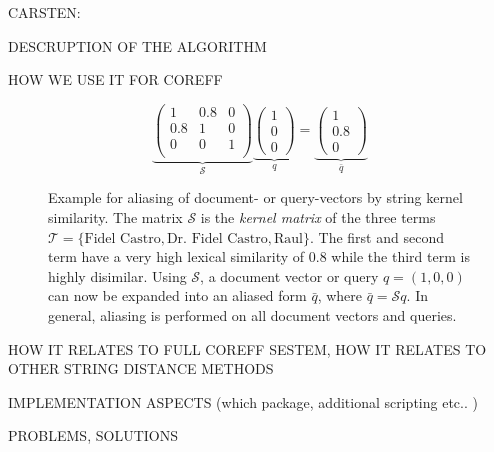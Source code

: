 
CARSTEN:

DESCRUPTION OF THE ALGORITHM

HOW WE USE IT FOR COREFF

\begin{figure}[ht]
  \caption{Example for aliasing of document- or query-vectors by string kernel similarity.
The matrix $\mathcal{S}$ is the \textit{kernel matrix} of the three terms $\mathcal{T} = \lbrace
\text{Fidel Castro},\text{Dr. Fidel Castro}, \text{Raul}\rbrace$. The first and second term have a
very high lexical similarity of $0.8$ while the third term is highly disimilar. Using
$\mathcal{S}$, a document vector or query $q=(1,0,0)$ can now be expanded into an aliased form
$\bar q$, where $\bar q = \mathcal{S}q$. In general, aliasing is performed on all document vectors
and queries.}
  \[
     \underbrace{\begin{pmatrix}
      1   & 0.8 & 0\\
      0.8 & 1   & 0\\
      0   & 0   & 1\\
     \end{pmatrix}}_{\mathcal{S}}
     \underbrace{\begin{pmatrix}
     1\\ 0\\0 
     \end{pmatrix}}_{q}
     =
     \underbrace{\begin{pmatrix}
     1\\ 0.8\\0 
     \end{pmatrix}}_{\bar q}
  \]
  \label{eq:example_string_sim}
\end{figure}


HOW IT RELATES TO FULL COREFF SESTEM, HOW IT RELATES TO OTHER STRING DISTANCE METHODS

IMPLEMENTATION ASPECTS (which package, additional scripting etc.. )

PROBLEMS, SOLUTIONS



